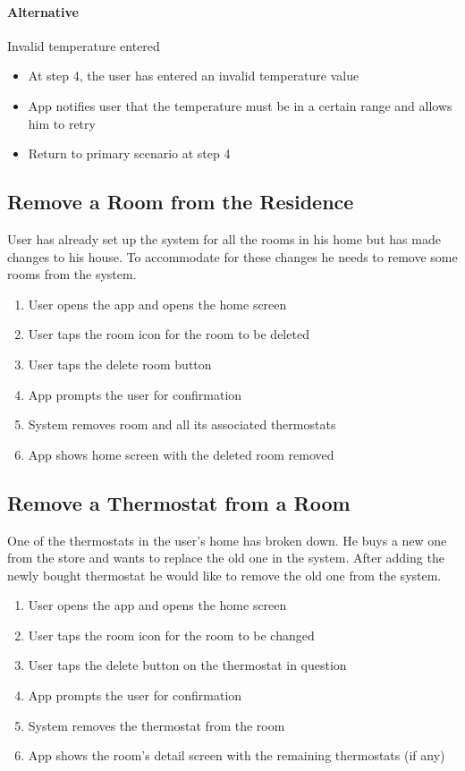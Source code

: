 \paragraph{Alternative} Invalid temperature entered
\begin{itemize}
    \item At step 4, the user has entered an invalid temperature value
    \item App notifies user that the temperature must be in a certain range and allows him to retry
    \item Return to primary scenario at step 4
\end{itemize}

\subsection{Remove a Room from the Residence}
User has already set up the system for all the rooms in his home but has made changes to his house. To accommodate for these changes he needs to remove some rooms from the system.
\begin{enumerate}
    \item User opens the app and opens the home screen
    \item User taps the room icon for the room to be deleted
    \item User taps the delete room button
    \item App prompts the user for confirmation
    \item System removes room and all its associated thermostats
    \item App shows home screen with the deleted room removed
\end{enumerate}

\subsection{Remove a Thermostat from a Room}
One of the thermostats in the user's home has broken down. He buys a new one from the store and wants to replace the old one in the system. After adding the newly bought thermostat he would like to remove the old one from the system.
\begin{enumerate}
    \item User opens the app and opens the home screen
    \item User taps the room icon for the room to be changed
    \item User taps the delete button on the thermostat in question
    \item App prompts the user for confirmation
    \item System removes the thermostat from the room
    \item App shows the room's detail screen with the remaining thermostats (if any)
\end{enumerate}

